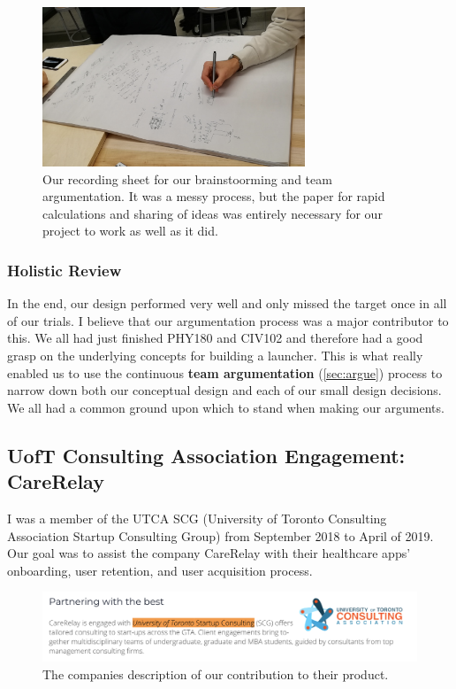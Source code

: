 \documentclass[a4paper,12pt]{article}
\begin{document}
\begin{figure}[H]
\centering
\includegraphics[width=0.7\textwidth]{img/image008.png}
\caption{Our recording sheet for our brainstoorming and team argumentation. It was a messy process, but the paper for rapid calculations and sharing of ideas was entirely necessary for our project to work as well as it did.}
\label{}
\end{figure}

\subsubsection{Holistic Review}
In the end, our design performed very well and only missed the target once in all of our trials. I believe that our argumentation process was a major contributor to this. We all had just finished PHY180 and CIV102 and therefore had a good grasp on the underlying concepts for building a launcher. This is what really enabled us to use the continuous \textbf{team argumentation} (\ref{sec:argue}) process to narrow down both our conceptual design and each of our small design decisions. We all had a common ground upon which to stand when making our arguments.

\subsection{UofT Consulting Association Engagement: CareRelay}
\label{sec:UTCA}
I was a member of the UTCA SCG (University of Toronto Consulting Association Startup Consulting Group) from September 2018 to April of 2019. Our goal was to assist the company CareRelay with their healthcare apps’ onboarding, user retention, and user acquisition process. 

\begin{figure}[H]
\centering
\includegraphics[width=1\textwidth]{img/image009.png}
\caption{The companies description of our contribution to their product.}
\label{}
\end{figure}
\end{document}
